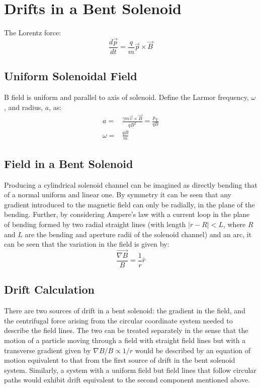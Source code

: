 \chapter{Drifts in a Bent Solenoid}
\label{sec:appendix:bent-solenoid}
The Lorentz force:
\begin{equation}
\frac{d\vec{p}}{dt}=\frac{q}{m}\vec{p}\times\vec{B}
\end{equation}

\section{Uniform Solenoidal Field}
B field is uniform and parallel to axis of solenoid.
Define the Larmor frequency, $\omega$, and radius, $a$, as:
\begin{align}
a=&\frac{\gamma m \vec{v}\times\vec{B}}{qB^2} = \frac{p_\mathrm{T}}{qB} \\
\omega=&\frac{qB}{m}
\end{align}

\section{Field in a Bent Solenoid}
Producing a cylindrical solenoid  channel can be imagined as directly bending that of a normal uniform and linear one.
By symmetry it can be seen that any gradient introduced to the magnetic field can only be radially, in the plane of the bending.
Further, by considering Ampere's law with a current loop in the plane of bending formed by two radial straight lines (with length $|r-R|<L$, where $R$ and $L$ are the bending and aperture radii of the solenoid channel) and an arc,
it can be seen that the variation in the field is given by:
\begin{equation}
\frac{\vec{\nabla B}}{B}=\frac{1}{r}\hat{r}
\end{equation}

\section{Drift Calculation}
There are two sources of drift in a bent solenoid: the gradient in the field, and the centrifugal force arising from the circular coordinate system needed to describe the field lines.
The two can be treated separately in the sense that the motion of a particle moving through a field with straight field lines but with a transverse gradient given by $\nabla B/ B \propto 1/r$ would be described by an equation of motion equivalent to that from the first source of drift in the bent solenoid system. 
Similarly, a system with a uniform field but field lines that follow circular paths would exhibit drift equivalent to the second component mentioned above.

